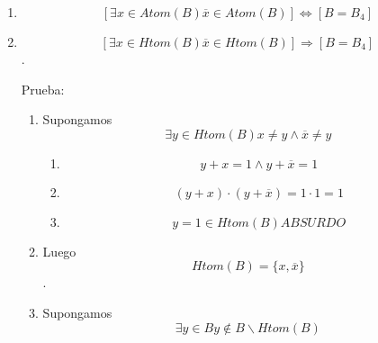 \begin{enumerate}
\begin{enumerate}
\begin{enumerate}
\begin{enumerate}
        \[\land \left\lbrack {{{\left\lbrack {x\mathsf{\mathit{minimal}}y} \right\rbrack \land \left\lbrack {\overline{x}\mathsf{\mathit{minimal}}\overline{y}} \right\rbrack} \land \left\lbrack {\neg{({x\mathsf{\mathit{minimal}}\overline{y}})}} \right\rbrack} \land \left\lbrack {\neg{({\overline{x}\mathsf{\mathit{minimal}}y})}} \right\rbrack} \right\rbrack\]
      \item
        \[\forall{{\{{y,\overline{y}}\}} \subset B_{\ast}^{\ast}}{{{y \cdot \overline{x}} = {{0 \land y} + \overline{x}}} = 1}\]
      \item
        \[\forall{{\{{y,\overline{y}}\}} \subset B_{\ast}^{\ast}}{{y = {x \land \overline{y}}} = \overline{x}}\]
      \item
        \[{B_{\ast}^{\ast} = {{\{ 1,0\}} \cup \mathit{Atom}}}{{{(B)} = {\{{1,0,x,\overline{x}}\}}} = B_{4}}\]
      \end{enumerate}
    \item
      \[\left\lbrack {\exists{x \in \mathit{Atom}}{(B)}{\overline{x} \in \mathit{Atom}}{(B)}} \right\rbrack\Leftrightarrow\left\lbrack {B = B_{4}} \right\rbrack\]
    \item
      \[\left\lbrack {\exists{x \in \mathit{Htom}}{(B)}{\overline{x} \in \mathit{Htom}}{(B)}} \right\rbrack\Rightarrow\left\lbrack {B = B_{4}} \right\rbrack\].

      Prueba:

      \begin{enumerate}
      \def\labelenumiv{\arabic{enumiv}.}
      \item
        Supongamos
        \[\exists{y \in \mathit{Htom}}{(B)}{{x \neq {y \land \overline{x}}} \neq y}\]

        \begin{enumerate}
        \def\labelenumv{\arabic{enumv}.}
        \tightlist
        \item
          \[{{y + x} = {{1 \land y} + \overline{x}}} = 1\]
        \item
          \[{{{({y + x})} \cdot {({y + \overline{x}})}} = {1 \cdot 1}} = 1\]
        \item
          \[{{y = 1} \in \mathit{Htom}}{(B)}\mathit{ABSURDO}\]
        \end{enumerate}
      \item
        Luego \[\mathit{Htom}{{(B)} = {\{{x,\overline{x}}\}}}\].
      \item
        Supongamos
        \[\exists{y \in B}{y \notin {B \smallsetminus {\mathit{Htom}{(B)}}}}\]


\end{enumerate}
\end{enumerate}
\end{enumerate}
\end{enumerate}
